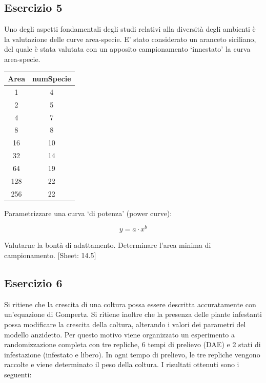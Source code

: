 \documentclass[a4paper,12pt,oneside]{book}
\begin{document}
\hypertarget{esercizio-5-6}{%
\subsection{Esercizio 5}\label{esercizio-5-6}}

Uno degli aspetti fondamentali degli studi relativi alla diversità degli ambienti è la valutazione delle curve area-specie. E' stato considerato un aranceto siciliano, del quale è stata valutata con un apposito campionamento `innestato' la curva area-specie.

\begin{longtable}[]{@{}cc@{}}
\toprule
Area & numSpecie \\
\midrule
\endhead
1 & 4 \\
2 & 5 \\
4 & 7 \\
8 & 8 \\
16 & 10 \\
32 & 14 \\
64 & 19 \\
128 & 22 \\
256 & 22 \\
\bottomrule
\end{longtable}

Parametrizzare una curva `di potenza' (power curve):

\[y = a \cdot x^b\]

Valutarne la bontà di adattamento. Determinare l'area minima di campionamento.
{[}Sheet: 14.5{]}

\hypertarget{esercizio-6-4}{%
\subsection{Esercizio 6}\label{esercizio-6-4}}

Si ritiene che la crescita di una coltura possa essere descritta accuratamente con un'equazione di Gompertz. Si ritiene inoltre che la presenza delle piante infestanti possa modificare la crescita della coltura, alterando i valori dei parametri del modello anzidetto. Per questo motivo viene organizzato un esperimento a randomizzazione completa con tre repliche, 6 tempi di prelievo (DAE) e 2 stati di infestazione (infestato e libero). In ogni tempo di prelievo, le tre repliche vengono raccolte e viene determinato il peso della coltura. I risultati ottenuti sono i seguenti:
\end{document}

